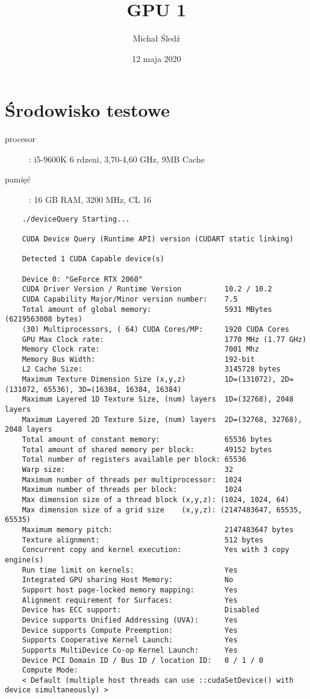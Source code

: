 \documentclass{article}
\title{GPU 1}
\author{Michał Śledź}
\date{12 maja 2020}
\begin{document}
    \maketitle

    \section{Środowisko testowe}
    \begin{description}
        \item [procesor]: i5-9600K 6 rdzeni, 3,70-4,60 GHz, 9MB Cache
        \item [pamięć]: 16 GB RAM, 3200 MHz, CL 16
    \end{description}
    \begin{lstlisting}
    ./deviceQuery Starting...

    CUDA Device Query (Runtime API) version (CUDART static linking)

    Detected 1 CUDA Capable device(s)

    Device 0: "GeForce RTX 2060"
    CUDA Driver Version / Runtime Version          10.2 / 10.2
    CUDA Capability Major/Minor version number:    7.5
    Total amount of global memory:                 5931 MBytes (6219563008 bytes)
    (30) Multiprocessors, ( 64) CUDA Cores/MP:     1920 CUDA Cores
    GPU Max Clock rate:                            1770 MHz (1.77 GHz)
    Memory Clock rate:                             7001 Mhz
    Memory Bus Width:                              192-bit
    L2 Cache Size:                                 3145728 bytes
    Maximum Texture Dimension Size (x,y,z)         1D=(131072), 2D=(131072, 65536), 3D=(16384, 16384, 16384)
    Maximum Layered 1D Texture Size, (num) layers  1D=(32768), 2048 layers
    Maximum Layered 2D Texture Size, (num) layers  2D=(32768, 32768), 2048 layers
    Total amount of constant memory:               65536 bytes
    Total amount of shared memory per block:       49152 bytes
    Total number of registers available per block: 65536
    Warp size:                                     32
    Maximum number of threads per multiprocessor:  1024
    Maximum number of threads per block:           1024
    Max dimension size of a thread block (x,y,z): (1024, 1024, 64)
    Max dimension size of a grid size    (x,y,z): (2147483647, 65535, 65535)
    Maximum memory pitch:                          2147483647 bytes
    Texture alignment:                             512 bytes
    Concurrent copy and kernel execution:          Yes with 3 copy engine(s)
    Run time limit on kernels:                     Yes
    Integrated GPU sharing Host Memory:            No
    Support host page-locked memory mapping:       Yes
    Alignment requirement for Surfaces:            Yes
    Device has ECC support:                        Disabled
    Device supports Unified Addressing (UVA):      Yes
    Device supports Compute Preemption:            Yes
    Supports Cooperative Kernel Launch:            Yes
    Supports MultiDevice Co-op Kernel Launch:      Yes
    Device PCI Domain ID / Bus ID / location ID:   0 / 1 / 0
    Compute Mode:
    < Default (multiple host threads can use ::cudaSetDevice() with device simultaneously) >


\end{lstlisting}
\end{document}
